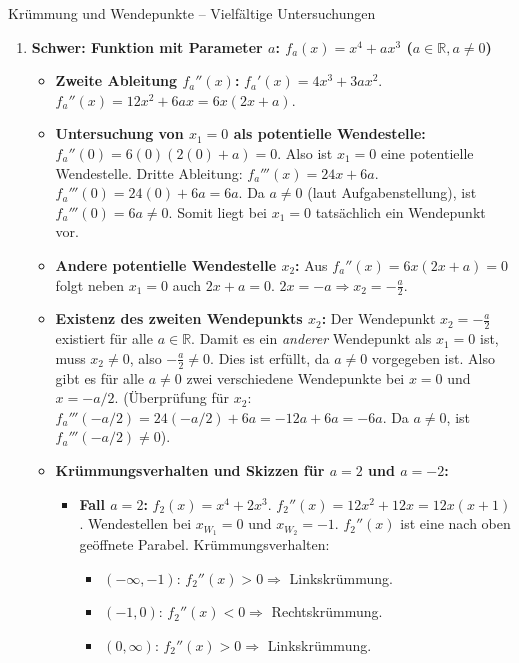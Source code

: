 \begin{loesungsumgebung}{Krümmung und Wendepunkte – Vielfältige Untersuchungen}
\begin{enumerate}[label=(\alph*)]
    \item \textbf{Schwer: Funktion mit Parameter $a$: $f_a(x) = x^4 + ax^3$ ($a \in \mathbb{R}, a \neq 0$)}
    \begin{itemize}
        \item \textbf{Zweite Ableitung $f_a''(x)$:}
        $f_a'(x) = 4x^3 + 3ax^2$.
        $f_a''(x) = 12x^2 + 6ax = 6x(2x+a)$.
        \item \textbf{Untersuchung von $x_1=0$ als potentielle Wendestelle:}
        $f_a''(0) = 6(0)(2(0)+a) = 0$. Also ist $x_1=0$ eine potentielle Wendestelle.
        Dritte Ableitung: $f_a'''(x) = 24x + 6a$.
        $f_a'''(0) = 24(0) + 6a = 6a$.
        Da $a \neq 0$ (laut Aufgabenstellung), ist $f_a'''(0) = 6a \neq 0$.
        Somit liegt bei $x_1=0$ tatsächlich ein Wendepunkt vor.
        \item \textbf{Andere potentielle Wendestelle $x_2$:}
        Aus $f_a''(x) = 6x(2x+a)=0$ folgt neben $x_1=0$ auch $2x+a=0$.
        $2x = -a \Rightarrow x_2 = -\frac{a}{2}$.
        \item \textbf{Existenz des zweiten Wendepunkts $x_2$:}
        Der Wendepunkt $x_2 = -\frac{a}{2}$ existiert für alle $a \in \mathbb{R}$.
        Damit es ein \textit{anderer} Wendepunkt als $x_1=0$ ist, muss $x_2 \neq 0$, also $-\frac{a}{2} \neq 0$. Dies ist erfüllt, da $a \neq 0$ vorgegeben ist.
        Also gibt es für alle $a \neq 0$ zwei verschiedene Wendepunkte bei $x=0$ und $x=-a/2$. (Überprüfung für $x_2$: $f_a'''(-a/2) = 24(-a/2) + 6a = -12a + 6a = -6a$. Da $a \neq 0$, ist $f_a'''(-a/2) \neq 0$).
        \item \textbf{Krümmungsverhalten und Skizzen für $a=2$ und $a=-2$:}
        \begin{itemize}
            \item \textbf{Fall $a=2$:} $f_2(x) = x^4 + 2x^3$.
            $f_2''(x) = 12x^2 + 12x = 12x(x+1)$.
            Wendestellen bei $x_{W_1}=0$ und $x_{W_2}=-1$.
            $f_2''(x)$ ist eine nach oben geöffnete Parabel.
            Krümmungsverhalten:
            \begin{itemize}
                \item $(-\infty, -1)$: $f_2''(x) > 0 \Rightarrow$ Linkskrümmung.
                \item $(-1, 0)$: $f_2''(x) < 0 \Rightarrow$ Rechtskrümmung.
                \item $(0, \infty)$: $f_2''(x) > 0 \Rightarrow$ Linkskrümmung.
            \end{itemize}
            \begin{center}

\end{center}
\end{itemize}
\end{itemize}
\end{enumerate}
\end{loesungsumgebung}
